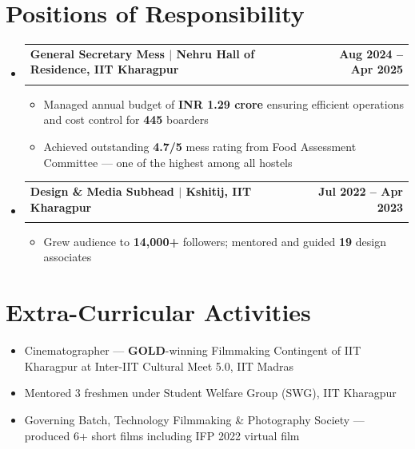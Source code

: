 \documentclass[letterpaper,11pt]{article}
\makeatletter
\newcommand{\resumeItem}[1]{
  \item\small{{#1 \vspace{-2pt}}}
}
\newcommand{\resumeSubheading}[4]{
  \vspace{-2pt}\item
    \begin{tabular*}{1.0\textwidth}[t]{l@{\extracolsep{\fill}}r}
      \textbf{#1} & \textbf{\small #2} \\
      \textit{\small#3} & \textit{\small #4} \\
    \end{tabular*}\vspace{-7pt}
}
\newcommand{\resumeSubHeadingListStart}{\begin{itemize}[leftmargin=0.0in, label={}]}
\newcommand{\resumeSubHeadingListEnd}{\end{itemize}}
\newcommand{\resumeItemListStart}{\begin{itemize}}
\newcommand{\resumeItemListEnd}{\end{itemize}\vspace{-5pt}}
\makeatother
\begin{document}
\section{Positions of Responsibility}
  \resumeSubHeadingListStart

    \resumeSubheading
      {General Secretary Mess $|$ Nehru Hall of Residence, IIT Kharagpur}{Aug 2024 -- Apr 2025}{}{}
    \resumeItemListStart
      \vspace{-4mm}
      \resumeItem{Managed annual budget of \textbf{INR 1.29 crore} ensuring efficient operations and cost control for \textbf{445} boarders}
      \resumeItem{Achieved outstanding \textbf{4.7/5} mess rating from Food Assessment Committee --- one of the highest among all hostels}
    \resumeItemListEnd

    \resumeSubheading
      {Design \& Media Subhead $|$ Kshitij, IIT Kharagpur}{Jul 2022 -- Apr 2023}{}{}
    \resumeItemListStart
      \vspace{-4mm}
      \resumeItem{Grew audience to \textbf{14,000+} followers; mentored and guided \textbf{19} design associates}
    \resumeItemListEnd

  \resumeSubHeadingListEnd

\section{Extra-Curricular Activities}
  \resumeSubHeadingListStart
    \resumeItemListStart
      \vspace{-1mm}
      \resumeItem{Cinematographer --- \textbf{GOLD}-winning Filmmaking Contingent of IIT Kharagpur at Inter-IIT Cultural Meet 5.0, IIT Madras}
      \resumeItem{Mentored 3 freshmen under Student Welfare Group (SWG), IIT Kharagpur}
      \resumeItem{Governing Batch, Technology Filmmaking \& Photography Society --- produced 6+ short films including IFP 2022 virtual film}
    \resumeItemListEnd
  \resumeSubHeadingListEnd
\end{document}
